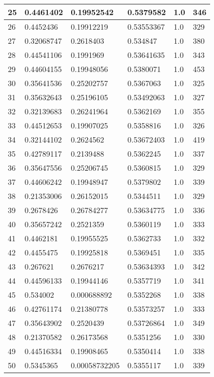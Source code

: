 \begin{longtable}{|l|l|l|l|l|l|}
25 & 0.4461402 & 0.19952542 & 0.5379582 & 1.0 & 346 \\ \hline 
26 & 0.4452436 & 0.19912219 & 0.53553367 & 1.0 & 329 \\ \hline 
27 & 0.32068747 & 0.2618403 & 0.534847 & 1.0 & 380 \\ \hline 
28 & 0.44541106 & 0.1991969 & 0.53641635 & 1.0 & 343 \\ \hline 
29 & 0.44604155 & 0.19948056 & 0.5380071 & 1.0 & 453 \\ \hline 
30 & 0.35641536 & 0.25202757 & 0.5367063 & 1.0 & 325 \\ \hline 
31 & 0.35632643 & 0.25196105 & 0.53492063 & 1.0 & 327 \\ \hline 
32 & 0.32139683 & 0.26241964 & 0.5362169 & 1.0 & 355 \\ \hline 
33 & 0.44512653 & 0.19907025 & 0.5358816 & 1.0 & 326 \\ \hline 
34 & 0.32144102 & 0.2624562 & 0.53672403 & 1.0 & 419 \\ \hline 
35 & 0.42789117 & 0.2139488 & 0.5362245 & 1.0 & 337 \\ \hline 
36 & 0.35647556 & 0.25206745 & 0.5360815 & 1.0 & 329 \\ \hline 
37 & 0.44606242 & 0.19948947 & 0.5379802 & 1.0 & 339 \\ \hline 
38 & 0.21353006 & 0.26152015 & 0.5344511 & 1.0 & 329 \\ \hline 
39 & 0.2678426 & 0.26784277 & 0.53634775 & 1.0 & 336 \\ \hline 
40 & 0.35657242 & 0.2521359 & 0.5360119 & 1.0 & 333 \\ \hline 
41 & 0.4462181 & 0.19955525 & 0.5362733 & 1.0 & 332 \\ \hline 
42 & 0.4455475 & 0.19925818 & 0.5369451 & 1.0 & 335 \\ \hline 
43 & 0.267621 & 0.2676217 & 0.53634393 & 1.0 & 342 \\ \hline 
44 & 0.44596133 & 0.19944146 & 0.5357719 & 1.0 & 341 \\ \hline 
45 & 0.534002 & 0.000688892 & 0.5352268 & 1.0 & 338 \\ \hline 
46 & 0.42761174 & 0.21380778 & 0.53573257 & 1.0 & 333 \\ \hline 
47 & 0.35643902 & 0.2520439 & 0.53726864 & 1.0 & 349 \\ \hline 
48 & 0.21370582 & 0.26173568 & 0.5351256 & 1.0 & 330 \\ \hline 
49 & 0.44516334 & 0.19908465 & 0.5350414 & 1.0 & 338 \\ \hline 
50 & 0.5345365 & 0.00058732205 & 0.5355117 & 1.0 & 339 \\ \hline 
\end{longtable}